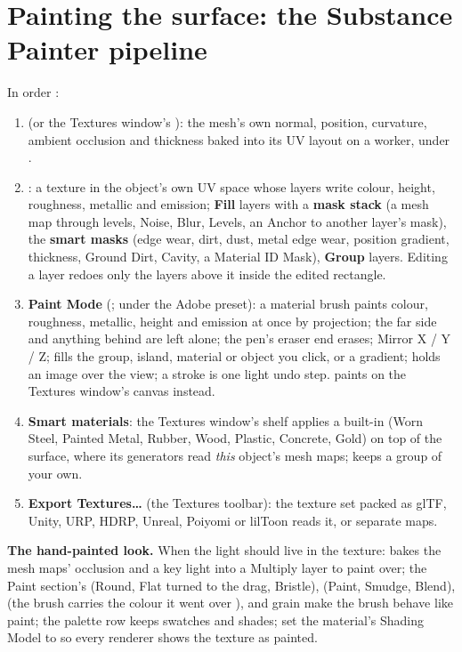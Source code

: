 \section{Painting the surface: the Substance Painter pipeline}
In order \cite{SubstancePainterDocs2026}:
\begin{enumerate}
  \item {} (or the Textures window's ): the mesh's own normal,
    position, curvature, ambient occlusion and thickness baked into its UV layout on a worker, under
    .
  \item {}: a texture in the object's own UV space whose layers write colour, height,
    roughness, metallic and emission; \textbf{Fill} layers with a \textbf{mask stack} (a mesh map through levels,
    Noise, Blur, Levels, an Anchor to another layer's mask), the \textbf{smart masks} (edge wear, dirt, dust, metal edge
    wear, position gradient, thickness, Ground Dirt, Cavity, a Material ID Mask), \textbf{Group} layers. Editing a
    layer redoes only the layers above it inside the edited rectangle.
  \item \textbf{Paint Mode} (;  under the Adobe preset): a material brush paints
    colour, roughness, metallic, height and emission at once by projection; the far side and anything behind are left
    alone; the pen's eraser end erases; Mirror X / Y / Z;  fills the group, island, material or object
    you click, or a gradient;  holds an image over the view; a stroke is one light undo step.  paints on the Textures window's canvas instead.
  \item \textbf{Smart materials}: the Textures window's shelf applies a built-in (Worn Steel, Painted Metal, Rubber,
    Wood, Plastic, Concrete, Gold) on top of the surface, where its generators read \emph{this} object's mesh maps;
     keeps a group of your own.
  \item \textbf{Export Textures\ldots} (the Textures toolbar): the texture set packed as glTF, Unity, URP, HDRP, Unreal,
    Poiyomi or lilToon reads it, or separate maps.
\end{enumerate}

\textbf{The hand-painted look.} When the light should live in the texture:  bakes the mesh maps'
occlusion and a key light into a Multiply layer to paint over; the Paint section's  (Round, Flat turned to the
drag, Bristle),  (Paint, Smudge, Blend),  (the brush carries the colour it went over
\cite{Baxter2004Impasto}),  and grain make the brush behave like paint; the palette row keeps swatches and
shades; set the material's Shading Model to  so every renderer shows the texture as painted.

